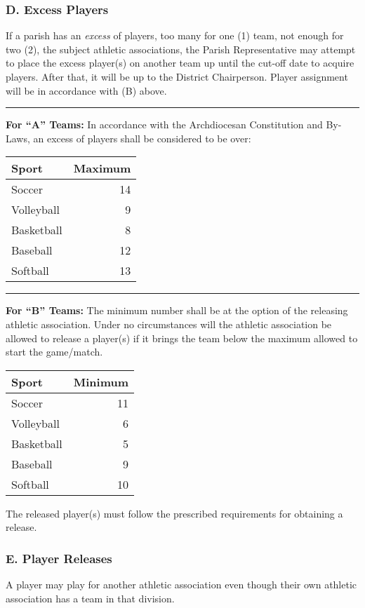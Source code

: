 \subsubsection{D. Excess Players}
If a parish has an {\em excess} of players, too many for one (1) team, not enough for two (2), the subject athletic associations, the Parish Representative may attempt to place the excess player(s) on another team up until the cut-off date to acquire players. After that, it will be up to the District Chairperson.  Player assignment will be in accordance with (B) above.
\plainbreak{1}
\textbf{For  ``A'' Teams:}  In accordance with the Archdiocesan Constitution and By-Laws, an excess of players shall be considered to be over:
\begin{center}
    \begin{tabular}{l r}
        Sport & Maximum \\
        \hline
        Soccer & 14 \\
        Volleyball & 9 \\
        Basketball & 8 \\
        Baseball & 12 \\
        Softball & 13 \\
        \hline
    \end{tabular}
\end{center}
\plainbreak{1}
\textbf{For ``B'' Teams:}  The minimum number shall be at the option of the releasing athletic association.  Under no circumstances will the athletic association be allowed to release a player(s) if it brings the team below the maximum allowed to start the game/match.
\begin{center}
    \begin{tabular}{l r}
        Sport & Minimum \\
        \hline
        Soccer & 11 \\
        Volleyball & 6 \\
        Basketball & 5 \\
        Baseball & 9 \\
        Softball & 10 \\
        \hline
    \end{tabular}
\end{center}

The released player(s) must follow the prescribed requirements for obtaining a release.

\subsubsection{E. Player Releases}
A player may play for another athletic association even though their own athletic association has a team in that division. 


